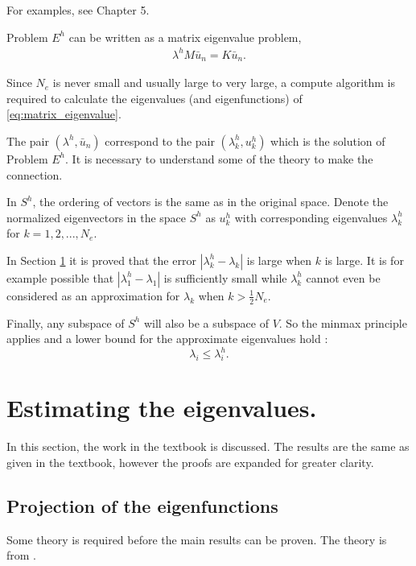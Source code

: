 \documentclass[../../main.tex]{subfiles}
\begin{document}
For examples, see Chapter 5.

Problem $E^h$ can be written as a matrix eigenvalue problem,
\begin{eqnarray}
	\lambda^hM\bar{u}_n = K\bar{u}_n. \label{eq:matrix_eigenvalue}
\end{eqnarray} 

Since $N_e$ is never small and usually large to very large, a compute algorithm is required to calculate the eigenvalues (and eigenfunctions) of \eqref{eq:matrix_eigenvalue}.

The pair $(\lambda^h, \bar{u}_n)$ correspond to the pair $(\lambda^h_k, u^h_k)$ which is the solution of Problem $E^h$. It is necessary to understand some of the theory to make the connection.

In $S^h$, the ordering of vectors is the same as in the original space. Denote the normalized eigenvectors in the space $S^h$ as $u^h_k$ with corresponding eigenvalues $\lambda^h_k$ for $k = 1,2,...,N_e$.

In Section \ref{sec:estimating_the_eigenvalues} it is proved that the error $| \lambda_k^h - \lambda_k|$ is large when $k$ is large. It is for example possible that $|\lambda^h_1 - \lambda_1|$ is sufficiently small while $\lambda^h_k$ cannot even be considered as an approximation for $\lambda_k$ when $\displaystyle k > \frac{1}{2}N_e$.

Finally, any subspace of $S^h$ will also be a subspace of $V$. So the minmax principle applies and a lower bound for the approximate eigenvalues hold \cite{SF73}:
\begin{equation}
	\lambda_i \leq \lambda_i^h.
\end{equation}

\section{Estimating the eigenvalues.} \label{sec:estimating_the_eigenvalues}
In this section, the work in the textbook \cite{SF73} is discussed. The results are the same as given in the textbook, however the proofs are expanded for greater clarity.

\subsection{Projection of the eigenfunctions}

Some theory is required before the main results can be proven. The theory is from \cite{SF73}.
\end{document}
